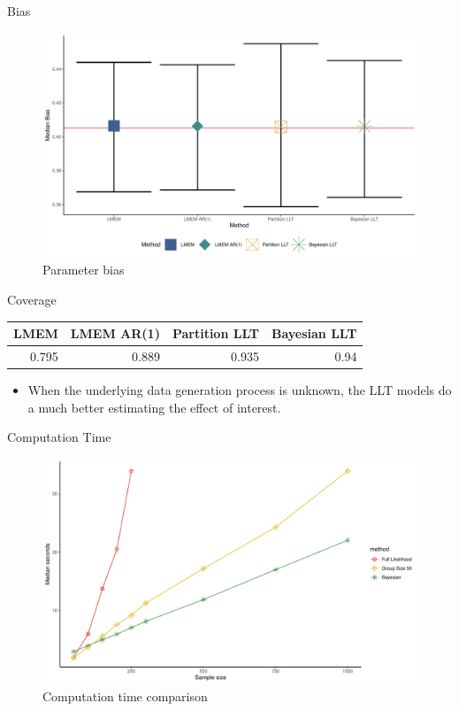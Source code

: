 \documentclass[
  ignorenonframetext,
]{beamer}
\providecommand{\tightlist}{%
  \setlength{\itemsep}{0pt}\setlength{\parskip}{0pt}}
\begin{document}
\begin{frame}{Bias}
\protect\hypertarget{bias}{}
\begin{figure}
\centering
\includegraphics{Prez4_files/figure-beamer/unnamed-chunk-24-1.pdf}
\caption{Parameter bias}
\end{figure}
\end{frame}

\begin{frame}{Coverage}
\protect\hypertarget{coverage-1}{}
\begin{longtable}[t]{r|r|r|r}
\hline
LMEM & LMEM AR(1) & Partition LLT & Bayesian LLT\\
\hline
0.795 & 0.889 & 0.935 & 0.94\\
\hline
\end{longtable}

\begin{itemize}
\tightlist
\item
  When the underlying data generation process is unknown, the LLT models
  do a much better estimating the effect of interest.
\end{itemize}
\end{frame}

\begin{frame}{Computation Time}
\protect\hypertarget{computation-time}{}
\begin{figure}
\centering
\includegraphics{Prez4_files/figure-beamer/compTime-1.pdf}
\caption{Computation time comparison}
\end{figure}
\end{frame}
\end{document}
